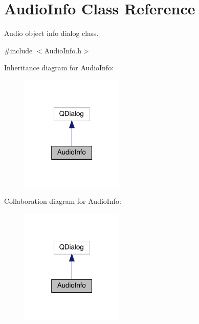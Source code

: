 \hypertarget{class_audio_info}{}\section{Audio\+Info Class Reference}
\label{class_audio_info}


Audio object info dialog class.  




{\ttfamily \#include $<$Audio\+Info.\+h$>$}



Inheritance diagram for Audio\+Info\+:
\nopagebreak
\begin{figure}[H]
\begin{center}
\leavevmode
\includegraphics[width=139pt]{class_audio_info__inherit__graph}
\end{center}
\end{figure}


Collaboration diagram for Audio\+Info\+:
\nopagebreak
\begin{figure}[H]
\begin{center}
\leavevmode
\includegraphics[width=139pt]{class_audio_info__coll__graph}
\end{center}
\end{figure}
